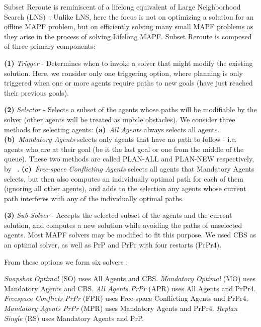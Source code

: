 \documentclass{article}
\newcommand{\sr}{Subset Reroute\xspace}
\newcommand{\allA}{All Agents\xspace}
\newcommand{\manA}{Mandatory Agents\xspace}
\newcommand{\freeA}{Free-space Conflicting Agents\xspace}
\newcommand{\lm}{Lifelong MAPF\xspace}
\newcommand{\citet}[1]{\citeauthor{#1}~\shortcite{#1}}
\begin{document}
\sr is reminiscent of a lifelong equivalent of Large Neighborhood Search (LNS)~\cite{li2021anytime}. Unlike LNS, here the focus is not on optimizing a solution for an offline MAPF problem, but on efficiently solving many small MAPF problems as they arise in the process of solving \lm.
\sr is composed of three primary components: 

\textbf{(1)} \emph{Trigger} - Determines when to invoke a solver that might modify the existing solution. Here, we consider only one triggering option, where planning is only triggered when one or more agents require paths to new goals (have just reached their previous goals).

\textbf{(2)} \emph{Selector} - Selects a subset of the agents whose paths will be modifiable by the solver (other agents will be treated as mobile obstacles). We consider three methods for selecting agents:
\textbf{(a)}~\emph{\allA} always selects all agents. \textbf{(b)}~\emph{\manA} selects only agents that have no path to follow - i.e. agents who are at their goal (be it the last goal or one from the middle of the queue). These two methods are called PLAN-ALL and PLAN-NEW respectively, by \citet{ma2021competitive}. \textbf{(c)}~\emph{\freeA} selects all agents that \manA selects, but then also computes an individually optimal path for each of them (ignoring all other agents), and adds to the selection any agents whose current path interferes with any of the individually optimal paths.

\textbf{(3)} \emph{Sub-Solver} - Accepts the selected subset of the agents and the current solution, and computes a new solution while avoiding the paths of unselected agents. Most MAPF solvers may be modified to fit this purpose. We used CBS as an optimal solver, as well as PrP and PrPr with four restarts (PrPr4).

% 

From these options we form six solvers 
: 

\emph{Snapshot Optimal} (SO) \cite{stern2019multi} uses \allA and CBS. 
\emph{Mandatory Optimal} (MO) uses \manA and CBS. 
\emph{All Agents PrPr} (APR) uses \allA and PrPr4.
\emph{Freespace Conflicts PrPr} (FPR) uses \freeA and PrPr4.
\emph{Mandatory Agents PrPr} (MPR) uses \manA and PrPr4.
\emph{Replan Single} (RS) \cite{stern2019multi} uses \manA and PrP. 
\end{document}
